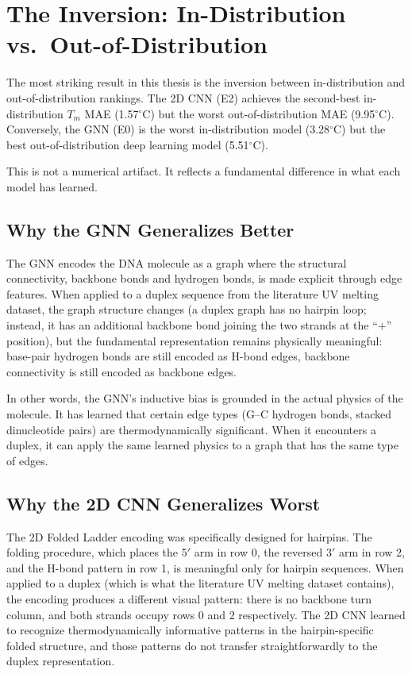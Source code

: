 \documentclass[12pt,oneside,letterpaper]{report}
\begin{document}
\section{The Inversion: In-Distribution vs.\ Out-of-Distribution}

The most striking result in this thesis is the inversion between in-distribution and out-of-distribution rankings. The 2D CNN (E2) achieves the second-best in-distribution $T_m$ MAE (1.57$^\circ$C) but the worst out-of-distribution MAE (9.95$^\circ$C). Conversely, the GNN (E0) is the worst in-distribution model (3.28$^\circ$C) but the best out-of-distribution deep learning model (5.51$^\circ$C).

This is not a numerical artifact. It reflects a fundamental difference in what each model has learned.

\subsection{Why the GNN Generalizes Better}

The GNN encodes the DNA molecule as a graph where the structural connectivity, backbone bonds and hydrogen bonds, is made explicit through edge features. When applied to a duplex sequence from the literature UV melting dataset, the graph structure changes (a duplex graph has no hairpin loop; instead, it has an additional backbone bond joining the two strands at the ``$+$'' position), but the fundamental representation remains physically meaningful: base-pair hydrogen bonds are still encoded as H-bond edges, backbone connectivity is still encoded as backbone edges.

In other words, the GNN's inductive bias is grounded in the actual physics of the molecule. It has learned that certain edge types (G--C hydrogen bonds, stacked dinucleotide pairs) are thermodynamically significant. When it encounters a duplex, it can apply the same learned physics to a graph that has the same type of edges.

\subsection{Why the 2D CNN Generalizes Worst}

The 2D Folded Ladder encoding was specifically designed for hairpins. The folding procedure, which places the 5$'$ arm in row 0, the reversed 3$'$ arm in row 2, and the H-bond pattern in row 1, is meaningful only for hairpin sequences. When applied to a duplex (which is what the literature UV melting dataset contains), the encoding produces a different visual pattern: there is no backbone turn column, and both strands occupy rows 0 and 2 respectively. The 2D CNN learned to recognize thermodynamically informative patterns in the hairpin-specific folded structure, and those patterns do not transfer straightforwardly to the duplex representation.
\end{document}
